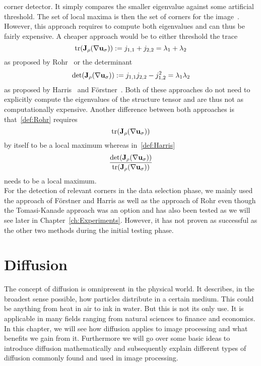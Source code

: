 corner detector. It simply compares the smaller eigenvalue against some artificial
threshold. The set of local maxima is then the set of corners for the image~\cite{shitomasi94}.
However, this approach requires to compute both eigenvalues and can thus be fairly expensive.
A cheaper approach would be to either threshold the trace 
\begin{equation}
    \operatorname{tr}(\mathbf{J}_\rho(\mathbf{\nabla}\mathbf{u}_\sigma)) := j_{1, 1} + j_{2,
    2} = \lambda_1 + \lambda_2\label{def:Rohr}
\end{equation} 
as proposed by Rohr~\cite{rohr91} or the determinant 
\begin{equation}
    \det(\mathbf{J}_\rho(\mathbf{\nabla}\mathbf{u}_\sigma)) := j_{1, 1}j_{2, 2} -
    j_{1, 2}^2 = \lambda_1\lambda_2\label{def:Harris}
\end{equation} 
as proposed by Harris~\cite{harris88} and Förstner~\cite{foerstner87}. Both of these approaches do 
not need to explicitly compute the eigenvalues of the structure tensor and are thus not as 
computationally expensive.\newpage\noindent
Another difference between both approaches is that~\eqref{def:Rohr} 
requires 
\begin{equation}
    \operatorname{tr}(\mathbf{J}_\rho(\mathbf{\nabla}\mathbf{u}_\sigma))
\end{equation}
by itself to be a local maximum whereas in~\eqref{def:Harris}
\begin{equation}
    \frac{\det(\mathbf{J}_\rho(\mathbf{\nabla}\mathbf{u}_\sigma))}{\operatorname{tr}(\mathbf{J}_\rho(\mathbf{\nabla}\mathbf{u}_\sigma))}
\end{equation} 
needs to be a local maximum.\\
For the detection of relevant corners in the data selection phase, we mainly used the approach of
Förstner and Harris as well as
the approach of Rohr even though the Tomasi-Kanade approach was an option and has also been
tested as we will see later in Chapter~\ref{ch:Experiments}. However, it has not proven as successful
as the other two methods during the initial testing phase.
\section{Diffusion}\label{sec:Diffusion}
The concept of diffusion is omnipresent in the physical world. It describes, in the broadest sense
possible, how particles distribute in a certain medium. This could be anything from heat in air to
ink in water. But this is not its only use. It is applicable in many fields ranging from
natural sciences to finance and economics. In this chapter, we will see how diffusion applies to
image processing and what benefits we gain from it. Furthermore we will go over some basic ideas to
introduce diffusion mathematically and subsequently explain different types of diffusion commonly
found and used in image processing.
